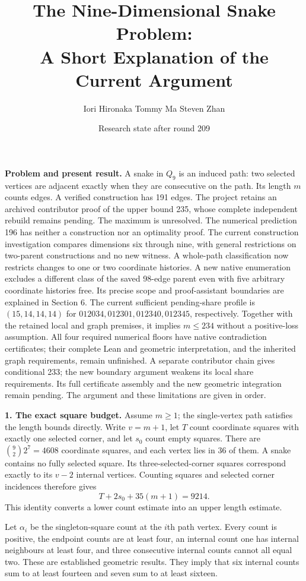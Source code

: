\documentclass[11pt,a4paper]{article}
\title{The Nine-Dimensional Snake Problem:\\A Short Explanation of the Current Argument}
\author{Iori Hironaka \quad Tommy Ma \quad Steven Zhan}
\date{Research state after round 209}
\begin{document}
\maketitle

\textbf{Problem and present result.}
A snake in $Q_9$ is an induced path: two selected vertices are adjacent
exactly when they are consecutive on the path. Its length $m$ counts
edges. A verified construction has 191 edges. The project retains an
archived contributor proof of the upper bound 235, whose complete
independent rebuild remains pending. The maximum is unresolved.
The numerical prediction 196 has neither a construction nor an optimality
proof. The current construction investigation compares dimensions six
through nine, with general restrictions on two-parent constructions
and no new witness. A whole-path classification now restricts changes
to one or two coordinate histories. A new native enumeration excludes
a different class of the saved 98-edge parent even with five arbitrary
coordinate histories free. Its precise scope and proof-assistant
boundaries are explained in Section 6. The current sufficient pending-share profile is $(15,14,14,14)$
for $012034,012301,012340,012345$, respectively. Together with the retained
local and graph premises, it implies $m\le234$ without a positive-loss
assumption. All four required numerical floors have native contradiction
certificates; their complete Lean and geometric interpretation, and the
inherited graph requirements, remain unfinished. A separate contributor chain gives conditional 233; the new boundary
argument weakens its local share requirements. Its full certificate
assembly and the new geometric integration remain pending. The argument
and these limitations are given in order.

\textbf{1. The exact square budget.}
Assume $m\ge1$; the single-vertex path satisfies the length bounds directly.
Write $v=m+1$, let $T$ count coordinate squares with exactly one selected
corner, and let $s_0$ count empty squares. There are
$\binom92 2^7=4608$ coordinate squares, and each vertex lies in 36 of them.
A snake contains no fully selected square. Its three-selected-corner
squares correspond exactly to its $v-2$ internal vertices. Counting
squares and selected corner incidences therefore gives
\[
\boxed{T+2s_0+35(m+1)=9214.}
\]
This identity converts a lower count estimate into an upper length estimate.

Let $\alpha_i$ be the singleton-square count at the $i$th path vertex.
Every count is positive, the endpoint counts are at least four, an internal
count one has internal neighbours at least four, and three consecutive
internal counts cannot all equal two. These are established geometric
results. They imply that six internal counts sum to at least fourteen and
seven sum to at least sixteen.
\end{document}
